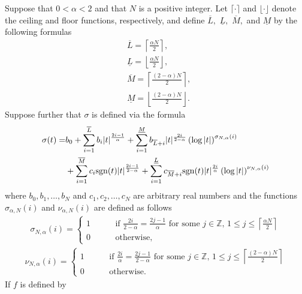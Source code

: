 \begin{theorem}\label{thm_cord}
Suppose that $0<\alpha<2$ and that $N$ is a positive integer. Let 
$\lceil \cdot \rceil$ and $\lfloor \cdot \rfloor$ denote the ceiling and floor functions,
respectively, and define $\overline{L},$ $\underline{L},$ $\overline{M},$ and 
$\underline{M}$ by the following formulas
\begin{align}
&\overline{L} = \left\lceil\frac{\alpha N}{2} \right \rceil, \\
&\underline{L} = \left\lfloor\frac{\alpha N}{2} \right \rfloor,\\
&\overline{M} = \left\lceil\frac{(2-\alpha) N}{2} \right \rceil, \\
&\underline{M} = \left\lfloor\frac{(2-\alpha) N}{2} \right \rfloor.
\end{align}
Suppose further that $\sigma$ is defined via the formula
\begin{align}
\sigma(t) =& b_0+\sum_{i=1}^{\overline{L}} b_i |t|^{\frac{2i-1}{\alpha}}+\sum_{i=1}^{\underline{M}} b_{\overline{L}+i} |t|^\frac{2i}{2-\alpha}\left(\log|t|\right)^{\sigma_{N,\alpha}(i)}\nonumber\\
&+\sum_{i=1}^{\overline{M}}c_i {\rm sgn}(t) |t|^\frac{2i-1}{2-\alpha}+\sum_{i=1}^{\underline{L}}c_{\overline{M}+i} {\rm sgn}(t) |t|^\frac{2i}{\alpha}\left(\log|t|\right)^{\nu_{N,\alpha}(i)}\label{eqn_rhfm}
\end{align}
where $b_0,b_1,\dots,b_N$ and $c_1,c_2,\dots,c_N$ are arbitrary real numbers and the functions $\sigma_{\alpha,N}(i)$ and $\nu_{\alpha,N}(i)$ are defined as follows
\begin{align}
\sigma_{N,\alpha}(i) = \begin{cases}
1 \quad\quad & \,\text{if}\,\, \frac{2i}{2-\alpha} = \frac{2j-1}{\alpha}\,\,\text{for some}\,\, j \in \mathbb{Z},\, 1\le j \le \left\lceil \frac{\alpha N}{2} \right\rceil\\
0 \quad\quad & \,\text{otherwise},
\end{cases}
\end{align}
\begin{align}
\nu_{N,\alpha}(i) = \begin{cases}
1 \quad\quad & \,\text{if}\,\, \frac{2i}{\alpha} = \frac{2j-1}{2-\alpha}\,\,\text{for some}\,\, j \in \mathbb{Z},\, 1\le j \le \left\lceil \frac{(2-\alpha) N}{2} \right\rceil\\
0 \quad\quad & \,\text{otherwise}.
\end{cases}
\end{align}
\noindent If $f$ is defined by

\end{theorem}
